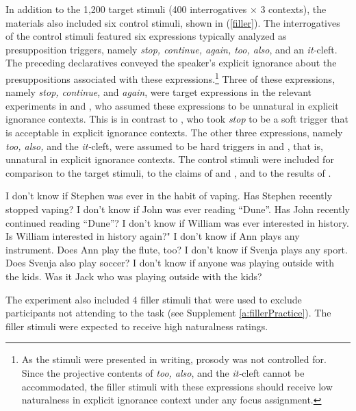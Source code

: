 \documentclass[11pt,fleqn]{article}
\newcommand{\6}{\mbox{$[\hspace*{-.6mm}[$}}
\newcommand{\9}{\mbox{$]\hspace*{-.6mm}]$}}
\begin{document}
In addition to the 1,200 target stimuli (400 interrogatives $\times$ 3 contexts), the materials also included six control stimuli, shown in (\ref{filler}). The interrogatives of the control stimuli featured six expressions typically analyzed as presupposition triggers, namely {\em stop, continue, again, too, also}, and an {\em it-}cleft. The preceding declaratives conveyed the speaker's explicit ignorance about the presuppositions associated with these expressions.\footnote{As the stimuli were presented in writing, prosody was not controlled for. Since the projective contents of {\em too, also}, and the {\em it-}cleft cannot be accommodated, the filler stimuli with these expressions should receive low naturalness in explicit ignorance context under any focus assignment.} Three of these expressions, namely {\em stop, continue,} and {\em again}, were target expressions in the relevant experiments in \citealt{mandelkern-etal2020} and \citealt{kalomoiros-schwarz2021}, who assumed these expressions to be unnatural in explicit ignorance contexts. This is in contrast to \citealt{simons01}, who took {\em stop} to be a soft trigger that is acceptable in explicit ignorance contexts. The other three expressions, namely {\em too, also,} and the {\em it-}cleft, were assumed to be hard triggers in \citealt{simons01} and \citealt{abusch10}, that is, unnatural in explicit ignorance contexts. The control stimuli were included for comparison to the target stimuli, to the claims of \citealt{simons01} and \citealt{abusch10}, and to the results of \citealt{mandelkern-etal2020}.

\begin{exe}
\ex\label{filler} 
\begin{xlist}
\ex I don't know if Stephen was ever in the habit of vaping. Has Stephen recently stopped vaping?
\ex I don't know if John was ever reading ``Dune''. Has John recently continued reading ``Dune''?
\ex I don't know if William was ever interested in history. Is William interested in history again?"
\ex I don't know if Ann plays any instrument. Does Ann play the flute, too?
\ex I don't know if Svenja plays any sport. Does Svenja also play soccer?
\ex I don't know if anyone was playing outside with the kids. Was it Jack who was playing outside with the kids?

\end{xlist}
\end{exe}

The experiment also included 4 filler stimuli that were used to exclude participants not attending to the task (see Supplement \ref{a:fillerPractice}). The filler stimuli were expected to receive high naturalness ratings.
\end{document}
